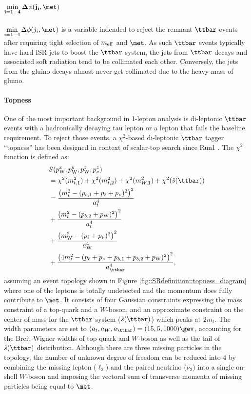 \paragraph{${\bf \mindPhiFourJet}$}
$\mindPhiFourJet$ is a variable indended to reject the remnant $\ttbar$ events after requiring tight selection of $m_{\mathrm{eff}}$ and $\met$. 
As such $\ttbar$ events typically have hard ISR jets to boost the $\ttbar$ system, the jets from $\ttbar$ decays and associated soft radiation tend to be collimated each other. Conversely, the jets from the gluino decays almost never get collimated due to the heavy mass of gluino.


\paragraph{Topness}
One of the most important background in 1-lepton analysis is di-leptonic $\ttbar$ events with a hadronically decaying tau lepton or a lepton that fails the baseline requirement. To reject those events, a $\chi^2$-based di-leptonic $\ttbar$ tagger ``topness'' has been designed in context of scalar-top search since Run1 \cite{Topness}. 
The $\chi^2$ function is defined as:
\begin{align}
& S(p_{\mathrm{W}}^x, p_{\mathrm{W}}^y, p_{\mathrm{W}}^z, p_{\nu}^z)  \nn  \\
& = \chi^2(m_{t,1}^2) + \chi^2(m_{t,2}^2) + \chi^2(m_{W,1}^2) + \chi^2(\hat{s}(\ttbar))  \nn  \\
& = \frac{  \left( m_t^2 - (p_{b,1}+p_{\ell}+p_{\nu})^2                      \right)^2   }{a_t^4}  \nn \\
& + \frac{  \left( m_t^2 - (p_{b,2}+p_\mathrm{W})^2                          \right)^2   }{a_t^4}  \nn  \\
& + \frac{  \left( m_\mathrm{W}^2 - (p_{\ell}+p_{\nu})^2                     \right)^2   }{a_\mathrm{W}^4}  \nn \\
& + \frac{  \left( 4m_t^2- (p_{\ell}+p_{\nu}+p_{b,1}+p_{b,2}+p_\mathrm{W})^2 \right)^2   }{a_{\ttbar}^4},
\label{eq:SRdefinition::topness}
\end{align}
assuming an event topology shown in Figure \ref{fig::SRdefinition::topness_diagram} where one of the leptons is totally undetected and the momentum does fully contribute to $\met$. 
It consists of four Gaussian constraints expressing the mass constraint of a top-quark and a $W$-boson, and an approximate constraint on the center-of-mass for the $\ttbar$ system ($\hat{s}(\ttbar)$) which peaks at $2m_t$. The width parameters are set to $(a_t, a_W, a_{\ttbar})=(15,5,1000) \gev$, accounting for the Breit-Wigner widths of top-quark and $W$-boson as well as the tail of $\hat{s}(\ttbar)$ distribution. Although there are three missing particles in the topology, the number of unknown degree of freedom can be reduced into 4 by combining the missing lepton ($\ell_2$) and the paired neutrino ($\nu_2$) into a single on-shell $W$-boson and imposing the vectoral sum of transverse momenta of missing particles being equal to $\met$. 
